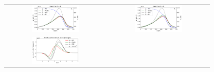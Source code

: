 \documentclass[
 aps,
 jmp,
 amsmath,amssymb,
 twocolumn,
]{revtex4-1}
\newcommand{\figscale}{0.48}
\begin{document}
\begin{figure}[htb]
  \begin{center}
    \begin{tabular}{cc}
        \includegraphics[width=\figscale\textwidth]{C7_Aladin_case5_heatflux.png} 
	  &
      \includegraphics[width=\figscale\textwidth]{C7_Calder_case5_heatflux.png} 
	  \\ 
      \includegraphics[width=\figscale\textwidth]{C7_Aladin_case5_kinetics.png} 

\end{tabular}
\end{center}
\end{figure}
\end{document}
